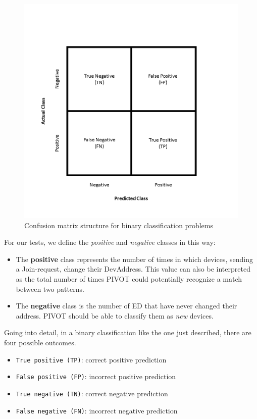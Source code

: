\vspace{3mm}
\begin{figure}[H]
    \centering
    \includegraphics[width=0.7\linewidth]{images/implementation/binary_classification.png}
    \caption{Confusion matrix structure for binary classification problems}
    \label{fig:classification}
\end{figure}
\vspace{3mm}

For our tests, we define the \textit{positive} and \textit{negative } classes in this way:

\vspace{3mm}
\begin{itemize}
    \item The \textbf{positive} class represents the number of times in which devices, sending a Join-request, change their DevAddress. This value can also be interpreted as the total number of times PIVOT could potentially recognize a match between two patterns.
    \item The \textbf{negative} class is the number of ED that have never changed their address. PIVOT should be able to classify them as \textit{new} devices. 
\end{itemize}
\vspace{3mm}

Going into detail, in a binary classification like the one just described, there are four possible outcomes.

\vspace{3mm}
\begin{itemize}
    \item \texttt{True positive (TP)}: correct positive prediction
    \item \texttt{False positive (FP)}: incorrect positive prediction
    \item \texttt{True negative (TN)}: correct negative prediction
    \item \texttt{False negative (FN)}: incorrect negative prediction
\end{itemize}

